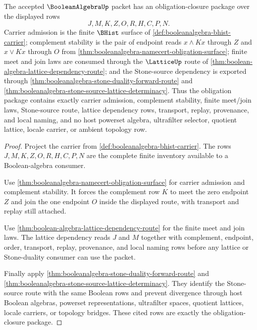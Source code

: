 \begin{theorem}
\label{thm:booleanalgebra-obligation-closure-package}
The accepted $\BooleanAlgebraUp$ packet has an obligation-closure package over the displayed rows
$$
J,M,K,Z,O,R,H,C,P,N .
$$
Carrier admission is the finite $\BHist$ surface of \autoref{def:booleanalgebra-bhist-carrier}; complement stability is the pair of endpoint reads $x \wedge Kx$ through $Z$ and $x \vee Kx$ through $O$ from \autoref{thm:booleanalgebra-namecert-obligation-surface}; finite meet and join laws are consumed through the $\LatticeUp$ route of \autoref{thm:boolean-algebra-lattice-dependency-route}; and the Stone-source dependency is exported through \autoref{thm:booleanalgebra-stone-duality-forward-route} and \autoref{thm:booleanalgebra-stone-source-lattice-determinacy}. Thus the obligation package contains exactly carrier admission, complement stability, finite meet/join laws, Stone-source route, lattice dependency rows, transport, replay, provenance, and local naming, and no host powerset algebra, ultrafilter selector, quotient lattice, locale carrier, or ambient topology row.
\end{theorem}
\begin{proof}
Project the carrier from \autoref{def:booleanalgebra-bhist-carrier}. The rows $J,M,K,Z,O,R,H,C,P,N$ are the complete finite inventory available to a Boolean-algebra consumer.

Use \autoref{thm:booleanalgebra-namecert-obligation-surface} for carrier admission and complement stability. It forces the complement row $K$ to meet the zero endpoint $Z$ and join the one endpoint $O$ inside the displayed route, with transport and replay still attached.

Use \autoref{thm:boolean-algebra-lattice-dependency-route} for the finite meet and join laws. The lattice dependency reads $J$ and $M$ together with complement, endpoint, order, transport, replay, provenance, and local naming rows before any lattice or Stone-duality consumer can use the packet.

Finally apply \autoref{thm:booleanalgebra-stone-duality-forward-route} and \autoref{thm:booleanalgebra-stone-source-lattice-determinacy}. They identify the Stone-source route with the same Boolean rows and prevent divergence through host Boolean algebras, powerset representations, ultrafilter spaces, quotient lattices, locale carriers, or topology bridges. These cited rows are exactly the obligation-closure package.
\end{proof}
